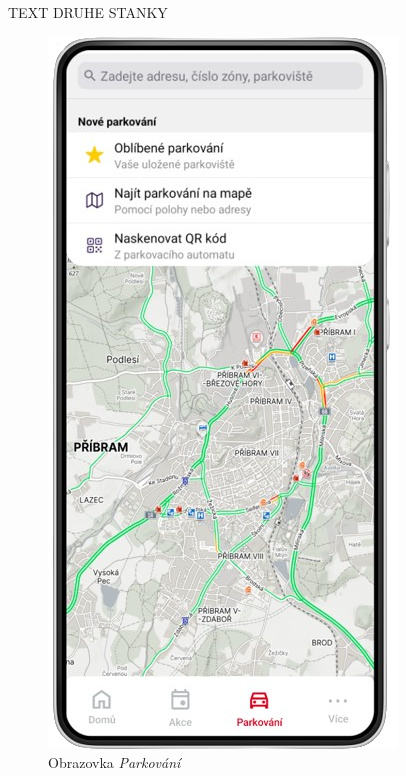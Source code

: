 \begin{minipage}[t]{0.45\textwidth}
  TEXT DRUHE STANKY
  \lipsum[1]
\end{minipage}
\hfill
\begin{minipage}[t]{0.45\textwidth}
  \begin{figure}[H]
    \centering
    \includegraphics[width=.6\textwidth]{screen3.png}
    \caption{Obrazovka \textit{Parkování}}
    \label{fig:mockup3}
  \end{figure}
  \begin{figure}[H]
    \centering

\end{figure}
\end{minipage}
